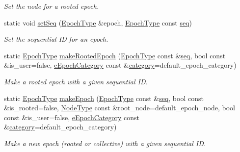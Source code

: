 \begin{DoxyCompactItemize}
\begin{DoxyCompactList}\small\item\em Set the node for a rooted {\ttfamily epoch}. \end{DoxyCompactList}\item 
static void \hyperlink{structvt_1_1epoch_1_1_epoch_manip_af1fb573c17b2bd4e6a789702cf0392dc}{set\+Seq} (\hyperlink{namespacevt_a985a5adf291c34a3ca263b3378388236}{Epoch\+Type} \&epoch, \hyperlink{namespacevt_a985a5adf291c34a3ca263b3378388236}{Epoch\+Type} const \hyperlink{structvt_1_1epoch_1_1_epoch_manip_ac34685702f19dde2f5bc25fcb43ec038}{seq})
\begin{DoxyCompactList}\small\item\em Set the sequential ID for an {\ttfamily epoch}. \end{DoxyCompactList}\item 
static \hyperlink{namespacevt_a985a5adf291c34a3ca263b3378388236}{Epoch\+Type} \hyperlink{structvt_1_1epoch_1_1_epoch_manip_a6a013fb8f78fe6b9298be472a00891f8}{make\+Rooted\+Epoch} (\hyperlink{namespacevt_a985a5adf291c34a3ca263b3378388236}{Epoch\+Type} const \&\hyperlink{structvt_1_1epoch_1_1_epoch_manip_ac34685702f19dde2f5bc25fcb43ec038}{seq}, bool const \&is\+\_\+user=false, \hyperlink{namespacevt_1_1epoch_a956abe0aceef0d10a988de8acb002c7c}{e\+Epoch\+Category} const \&\hyperlink{structvt_1_1epoch_1_1_epoch_manip_aa61d47033545df147c01036211c4cabe}{category}=default\+\_\+epoch\+\_\+category)
\begin{DoxyCompactList}\small\item\em Make a rooted epoch with a given sequential ID. \end{DoxyCompactList}\item 
static \hyperlink{namespacevt_a985a5adf291c34a3ca263b3378388236}{Epoch\+Type} \hyperlink{structvt_1_1epoch_1_1_epoch_manip_ac8489de69500dee4376806d56850adbc}{make\+Epoch} (\hyperlink{namespacevt_a985a5adf291c34a3ca263b3378388236}{Epoch\+Type} const \&\hyperlink{structvt_1_1epoch_1_1_epoch_manip_ac34685702f19dde2f5bc25fcb43ec038}{seq}, bool const \&is\+\_\+rooted=false, \hyperlink{namespacevt_a866da9d0efc19c0a1ce79e9e492f47e2}{Node\+Type} const \&root\+\_\+node=default\+\_\+epoch\+\_\+node, bool const \&is\+\_\+user=false, \hyperlink{namespacevt_1_1epoch_a956abe0aceef0d10a988de8acb002c7c}{e\+Epoch\+Category} const \&\hyperlink{structvt_1_1epoch_1_1_epoch_manip_aa61d47033545df147c01036211c4cabe}{category}=default\+\_\+epoch\+\_\+category)
\begin{DoxyCompactList}\small\item\em Make a new epoch (rooted or collective) with a given sequential ID. \end{DoxyCompactList}\item 

\end{DoxyCompactItemize}
